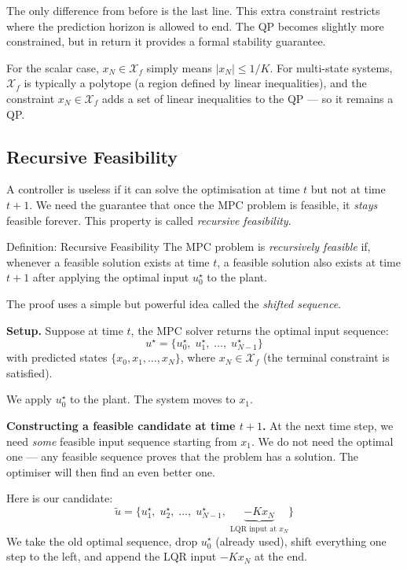 The only difference from before is the last line. This extra constraint restricts where the prediction horizon is allowed to end. The QP becomes slightly more constrained, but in return it provides a formal stability guarantee.

For the scalar case, $x_N \in \mathcal{X}_f$ simply means $|x_N| \le 1/K$. For multi-state systems, $\mathcal{X}_f$ is typically a polytope (a region defined by linear inequalities), and the constraint $x_N \in \mathcal{X}_f$ adds a set of linear inequalities to the QP --- so it remains a QP.

\subsection{Recursive Feasibility}

A controller is useless if it can solve the optimisation at time $t$ but not at time $t+1$. We need the guarantee that once the MPC problem is feasible, it \textit{stays} feasible forever. This property is called \emph{recursive feasibility}.

\begin{defnbox}{Definition: Recursive Feasibility}
	The MPC problem is \emph{recursively feasible} if, whenever a feasible solution exists at time $t$, a feasible solution also exists at time $t+1$ after applying the optimal input $u_0^\star$ to the plant.
\end{defnbox}

The proof uses a simple but powerful idea called the \emph{shifted sequence}.

\textbf{Setup.} Suppose at time $t$, the MPC solver returns the optimal input sequence:
\[
u^\star = \{u_0^\star,\; u_1^\star,\; \ldots,\; u_{N-1}^\star\}
\]
with predicted states $\{x_0, x_1, \ldots, x_N\}$, where $x_N \in \mathcal{X}_f$ (the terminal constraint is satisfied).

We apply $u_0^\star$ to the plant. The system moves to $x_1$.

\textbf{Constructing a feasible candidate at time $t+1$.}
At the next time step, we need \textit{some} feasible input sequence starting from $x_1$. We do not need the optimal one --- any feasible sequence proves that the problem has a solution. The optimiser will then find an even better one.

Here is our candidate:
\[
\tilde{u} = \{u_1^\star,\; u_2^\star,\; \ldots,\; u_{N-1}^\star,\; \underbrace{-K x_N}_{\text{LQR input at } x_N}\}
\]
We take the old optimal sequence, drop $u_0^\star$ (already used), shift everything one step to the left, and append the LQR input $-Kx_N$ at the end.

